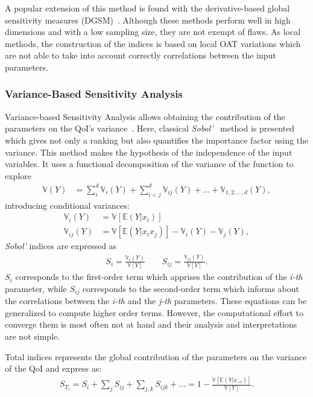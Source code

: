 A popular extension of this method is found with the derivative-based global sensitivity measures (DGSM)~\cite{kucherenko2016,Becker2018}. Although these methods perform well in high dimensions and with a low sampling size, they are not exempt of flaws. As local methods, the construction of the indices is based on local OAT variations which are not able to take into account correctly correlations between the input parameters.

\subsubsection{Variance-Based Sensitivity Analysis}
Variance-based Sensitivity Analysis allows obtaining the contribution of the parameters on the QoI's variance~\cite{ferretti2016}. Here, classical \textit{Sobol'}~\cite{Sobol1993} method is presented which gives not only a ranking but also quantifies the importance factor using the variance. This method makes the hypothesis of the independence of the input variables. It uses a functional decomposition of the variance of the function to explore
\begin{align}
\mathbb{V}(Y) &= \sum_{i}^{d} \mathbb{V}_i (Y) + \sum_{i<j}^{d}\mathbb{V}_{ij}(Y) + ... + \mathbb{V}_{1,2,...,d}(Y),
\end{align}
\noindent introducing conditional variances:
\begin{align}
\mathbb{V}_i(Y) &= \mathbb{\mathbb{V}}[\mathbb{E}(Y|x_i)]\nonumber\\
\mathbb{V}_{ij}(Y) &= \mathbb{\mathbb{V}}[\mathbb{E}(Y|x_i x_j)] - \mathbb{V}_i(Y) - \mathbb{V}_j(Y),\nonumber
\end{align}
\noindent \textit{Sobol'} indices are expressed as
\begin{align}
S_i = \frac{\mathbb{V}_i(Y)}{\mathbb{V}[Y]}\qquad S_{ij} = \frac{\mathbb{V}_{ij}(Y)}{\mathbb{V}[Y]}.
\end{align}
\noindent $S_{i}$ corresponds to the first-order term which apprises the contribution of the \textit{i-th} parameter, while $S_{ij}$ corresponds to the second-order term which informs about the correlations between the \textit{i-th} and the \textit{j-th} parameters. These equations can be generalized to compute higher order terms. However, the computational effort to converge them is most often not at hand and their analysis and interpretations are not simple.

Total indices represents the global contribution of the parameters on the variance of the QoI and express as:
\begin{align}
S_{T_i} = S_i + \sum_j S_{ij} + \sum_{j,k} S_{ijk} + ... = 1 - \frac{\mathbb{V}[\mathbb{E}(Y|x_{\sim i})]}{\mathbb{V}[Y]}.
\end{align}

